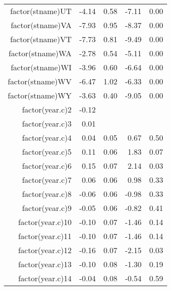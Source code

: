 \begin{table}[ht]
\begin{tabular}{rrrrr}
  factor(stname)UT & -4.14 & 0.58 & -7.11 & 0.00 \\ 
  factor(stname)VA & -7.93 & 0.95 & -8.37 & 0.00 \\ 
  factor(stname)VT & -7.73 & 0.81 & -9.49 & 0.00 \\ 
  factor(stname)WA & -2.78 & 0.54 & -5.11 & 0.00 \\ 
  factor(stname)WI & -3.96 & 0.60 & -6.64 & 0.00 \\ 
  factor(stname)WV & -6.47 & 1.02 & -6.33 & 0.00 \\ 
  factor(stname)WY & -3.63 & 0.40 & -9.05 & 0.00 \\ 
  factor(year.c)2 & -0.12 &  &  &  \\ 
  factor(year.c)3 & 0.01 &  &  &  \\ 
  factor(year.c)4 & 0.04 & 0.05 & 0.67 & 0.50 \\ 
  factor(year.c)5 & 0.11 & 0.06 & 1.83 & 0.07 \\ 
  factor(year.c)6 & 0.15 & 0.07 & 2.14 & 0.03 \\ 
  factor(year.c)7 & 0.06 & 0.06 & 0.98 & 0.33 \\ 
  factor(year.c)8 & -0.06 & 0.06 & -0.98 & 0.33 \\ 
  factor(year.c)9 & -0.05 & 0.06 & -0.82 & 0.41 \\ 
  factor(year.c)10 & -0.10 & 0.07 & -1.46 & 0.14 \\ 
  factor(year.c)11 & -0.10 & 0.07 & -1.46 & 0.14 \\ 
  factor(year.c)12 & -0.16 & 0.07 & -2.15 & 0.03 \\ 
  factor(year.c)13 & -0.10 & 0.08 & -1.30 & 0.19 \\ 
  factor(year.c)14 & -0.04 & 0.08 & -0.54 & 0.59 \\ 
   \hline
\end{tabular}
\end{table}

